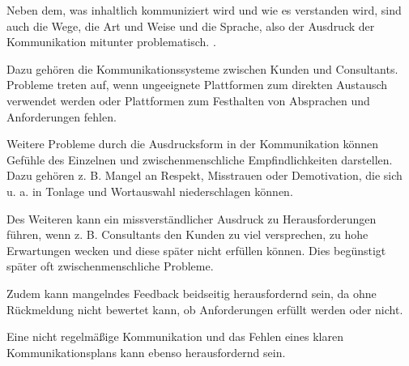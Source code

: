 \documentclass[../main.tex]{subfiles}
\begin{document}
Neben dem, was inhaltlich kommuniziert wird und wie es verstanden wird, sind auch die Wege, die Art und Weise und die Sprache, also der Ausdruck der Kommunikation mitunter problematisch. \autocite{cornelissen2023corporate}.

Dazu gehören die Kommunikationssysteme zwischen Kunden und Consultants. Probleme treten auf, wenn ungeeignete Plattformen zum direkten Austausch verwendet werden oder Plattformen zum Festhalten von Absprachen und Anforderungen fehlen.
\autocite{gamil2017identification,bjarnason2017role}

Weitere Probleme durch die Ausdrucksform in der Kommunikation können Gefühle des Einzelnen und zwischenmenschliche Empfindlichkeiten darstellen.
Dazu gehören z. B. Mangel an Respekt, Misstrauen oder Demotivation, die sich u. a. in Tonlage und Wortauswahl niederschlagen können. 
\autocite{mackenzie19597,appelbaum2005critical,bjarnason2017role}

Des Weiteren kann ein missverständlicher Ausdruck zu Herausforderungen führen, wenn z. B. Consultants den Kunden zu viel versprechen, zu hohe Erwartungen wecken und diese später nicht erfüllen können.
Dies begünstigt später oft zwischenmenschliche Probleme.
\autocite{mackenzie19597,appelbaum2005critical}

Zudem kann mangelndes Feedback beidseitig herausfordernd sein, da ohne Rückmeldung nicht bewertet kann, ob Anforderungen erfüllt werden oder nicht. 
\autocite{bano2014aligning,reihlen2010knowledge}

Eine nicht regelmäßige Kommunikation und das Fehlen eines klaren Kommunikationsplans kann ebenso herausfordernd sein.
\autocite{gamil2017identification,bjarnason2017role}
\end{document}
